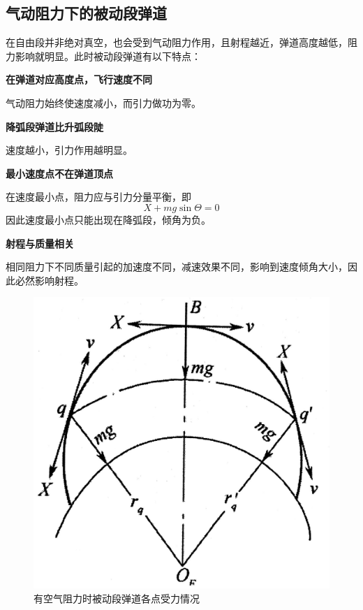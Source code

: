 \subsection{气动阻力下的被动段弹道}

在自由段并非绝对真空，也会受到气动阻力作用，且射程越近，弹道高度越低，阻力影响就明显。此时被动段弹道有以下特点：

\noa[1] \textbf{在弹道对应高度点，飞行速度不同}

气动阻力始终使速度减小，而引力做功为零。
\vspace*{0.5em}

\noa[2] \textbf{降弧段弹道比升弧段陡}

速度越小，引力作用越明显。
\vspace*{0.5em}
\clearpage

\noa[3] \textbf{最小速度点不在弹道顶点}

在速度最小点，阻力应与引力分量平衡，即
\begin{equation*}
	X + mg \sin \varTheta = 0
\end{equation*}
因此速度最小点只能出现在降弧段，倾角为负。
\vspace*{0.5em}

\noa[4] \textbf{射程与质量相关}

相同阻力下不同质量引起的加速度不同，减速效果不同，影响到速度倾角大小，因此必然影响射程。


\begin{figure}[!htb]
	\centering
	\includegraphics[width=0.35\linewidth]{pic/气动阻力再入.jpg}
	\vspace*{-1em}
	\caption{有空气阻力时被动段弹道各点受力情况}
\end{figure}














